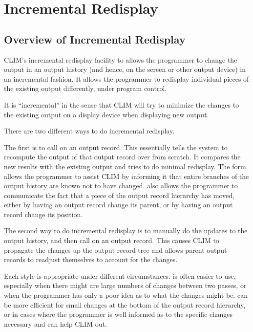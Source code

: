 
\chapter {Incremental Redisplay}
\label {incremental-redisplay}

\section {Overview of Incremental Redisplay}

CLIM's incremental redisplay facility to allows the programmer to change the
output in an output history (and hence, on the screen or other output device) in
an incremental fashion.  It allows the programmer to redisplay individual pieces
of the existing output differently, under program control.

It is ``incremental'' in the sense that CLIM will try to minimize the changes to
the existing output on a display device when displaying new output.

There are two different ways to do incremental redisplay.

The first is to call  on an output record.  This essentially tells
the system to recompute the output of that output record over from scratch.  It
compares the new results with the existing output and tries to do minimal
redisplay.  The  form allows the programmer to assist CLIM
by informing it that entire branches of the output history are known not to have
changed.   also allows the programmer to communicate the
fact that a piece of the output record hierarchy has moved, either by having an
output record change its parent, or by having an output record change its
position.

The second way to do incremental redisplay is to manually do the updates to the
output history, and then call  on an output
record.  This causes CLIM to propagate the changes up the output record tree and
allows parent output records to readjust themselves to account for the changes.

Each style is appropriate under different circumstances.   is
often easier to use, especially when there might are large numbers of changes
between two passes, or when the programmer has only a poor idea as to what the
changes might be.   can be more efficient
for small changes at the bottom of the output record hierarchy, or in cases
where the programmer is well informed as to the specific changes necessary and
can help CLIM out.


